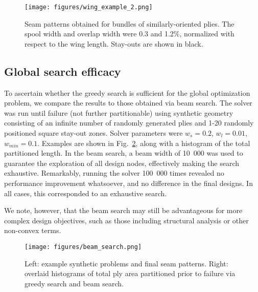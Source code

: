 \begin{figure*}[t]
    \centering
     \texttt{[image: figures/wing\_example\_2.png]}
    \caption{Seam patterns obtained for bundles of similarly-oriented plies. The spool width and overlap width were 0.3 and 1.2\%, normalized with respect to the wing length. Stay-outs are shown in black.}
    \label{fig:wing_example_2}
\end{figure*}

\subsection{Global search efficacy}
\label{sec:efficacy}

To ascertain whether the greedy search is sufficient for the global optimization problem, we compare the results to those obtained via beam search. The solver was run until failure (not further partitionable) using synthetic geometry consisting of an infinite number of randomly generated plies and 1-20 randomly positioned square stay-out zones. Solver parameters were $w_s = 0.2$, $w_l = 0.01$, $w_{min}=0.1$. Examples are shown in Fig.~\ref{fig:beam_width}, along with a histogram of the total partitioned length. 
In the beam search, a beam width of 10~000 was used to guarantee the exploration of all design nodes, effectively making the search exhaustive. Remarkably, running the solver 100~000 times revealed no performance improvement whatsoever, and no difference in the final designs. In all cases, this corresponded to an exhaustive search.

We note, however, that the beam search may still be advantageous for more complex design objectives, such as those including structural analysis or other non-convex terms.
\begin{figure}[t]
    \centering
     \texttt{[image: figures/beam\_search.png]}
    \caption{Left: example synthetic problems and final seam patterns. Right: overlaid histograms of total ply area partitioned prior to failure via greedy search and beam search.}
    \label{fig:beam_width}
\end{figure}

